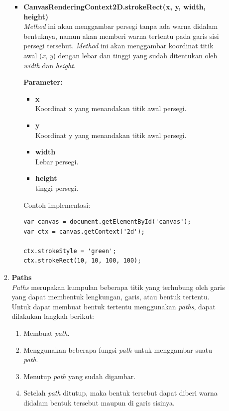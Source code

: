 \documentclass[a4paper,twoside]{article}
\begin{document}
\begin{enumerate}
\begin{enumerate}
\begin{enumerate}
\begin{itemize}
					\item \textbf{CanvasRenderingContext2D.strokeRect(x, y, width, height)} \\ 
					\textit{Method} ini akan menggambar persegi tanpa ada warna didalam bentuknya, namun akan memberi warna tertentu pada garis sisi persegi tersebut. \textit{Method} ini akan menggambar koordinat titik awal (\textit{x}, \textit{y}) dengan lebar dan tinggi yang sudah ditentukan oleh \textit{width} dan \textit{height}. 
					
					\textbf{Parameter:}
					\begin{itemize}
						\item \textbf{x} \\ Koordinat x yang menandakan titik awal persegi.
						\item \textbf{y} \\ Koordinat y yang menandakan titik awal persegi.
						\item \textbf{width} \\ Lebar persegi.
						\item \textbf{height} \\ tinggi persegi.
					\end{itemize}
					Contoh implementasi:
\begin{lstlisting}
var canvas = document.getElementById('canvas');
var ctx = canvas.getContext('2d');
					
ctx.strokeStyle = 'green';
ctx.strokeRect(10, 10, 100, 100);
\end{lstlisting}
				\end{itemize}
				
				\item \textbf{Paths} \\
				\textit{Paths} merupakan kumpulan beberapa titik yang terhubung oleh garis yang dapat membentuk lengkungan, garis, atau bentuk tertentu. Untuk dapat membuat bentuk tertentu menggunakan \textit{paths}, dapat dilakukan langkah berikut:
				\begin{enumerate}
					\item Membuat \textit{path}.
					\item Menggunakan beberapa fungsi \textit{path} untuk menggambar suatu \textit{path}.
					\item Menutup \textit{path} yang sudah digambar.
					\item Setelah \textit{path} ditutup, maka bentuk tersebut dapat diberi warna didalam bentuk tersebut maupun di garis sisinya.
				\end{enumerate}
				

\end{enumerate}
\end{enumerate}
\end{enumerate}
\end{document}
